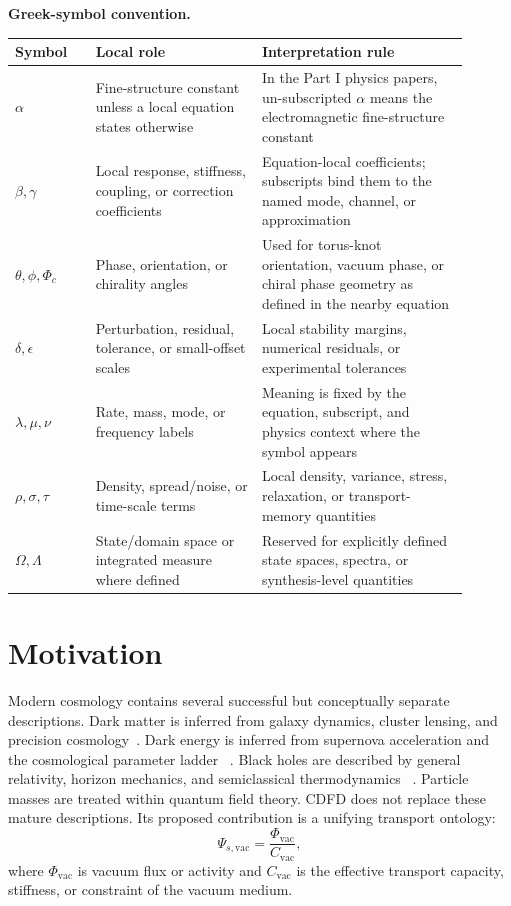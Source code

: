 \documentclass[11pt]{article}
\begin{document}
\noindent\textbf{Greek-symbol convention.}
\begin{center}
{\small
\begin{tabular}{p{0.16\linewidth}p{0.33\linewidth}p{0.41\linewidth}}
\hline
Symbol & Local role & Interpretation rule \\
\hline
$\alpha$ & Fine-structure constant unless a local equation states otherwise & In the Part I physics papers, un-subscripted $\alpha$ means the electromagnetic fine-structure constant \\
$\beta,\gamma$ & Local response, stiffness, coupling, or correction coefficients & Equation-local coefficients; subscripts bind them to the named mode, channel, or approximation \\
$\theta,\phi,\Phi_c$ & Phase, orientation, or chirality angles & Used for torus-knot orientation, vacuum phase, or chiral phase geometry as defined in the nearby equation \\
$\delta,\epsilon$ & Perturbation, residual, tolerance, or small-offset scales & Local stability margins, numerical residuals, or experimental tolerances \\
$\lambda,\mu,\nu$ & Rate, mass, mode, or frequency labels & Meaning is fixed by the equation, subscript, and physics context where the symbol appears \\
$\rho,\sigma,\tau$ & Density, spread/noise, or time-scale terms & Local density, variance, stress, relaxation, or transport-memory quantities \\
$\Omega,\Lambda$ & State/domain space or integrated measure where defined & Reserved for explicitly defined state spaces, spectra, or synthesis-level quantities \\
\hline
\end{tabular}
}
\end{center}

\section{Motivation}

Modern cosmology contains several successful but conceptually separate descriptions.
Dark matter is inferred from galaxy dynamics, cluster lensing, and precision
cosmology~\cite{RubinFord1970,Clowe2006,Planck2018}. Dark energy is inferred
from supernova acceleration and the cosmological parameter ladder
~\cite{Riess1998,Perlmutter1999,Planck2018}. Black holes are described by
general relativity, horizon mechanics, and semiclassical thermodynamics
~\cite{BardeenCarterHawking1973,Hawking1975}. Particle masses are treated
within quantum field theory. CDFD does not replace these mature descriptions.
Its proposed contribution is a unifying transport ontology:
\begin{equation}
    \Psi_{s,\mathrm{vac}}=\frac{\Phi_{\mathrm{vac}}}{C_{\mathrm{vac}}},
\end{equation}
where $\Phi_{\mathrm{vac}}$ is vacuum flux or activity and $C_{\mathrm{vac}}$ is the effective transport capacity, stiffness, or constraint of the vacuum medium.
\end{document}
